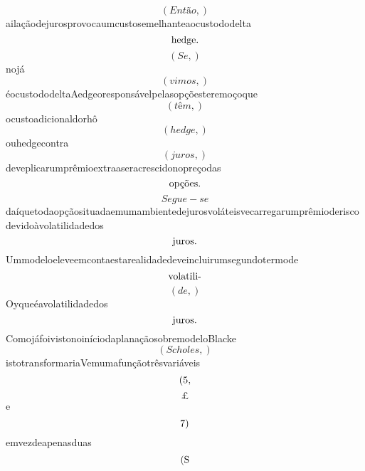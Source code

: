 \documentclass{article}
\begin{document}
\begin{equation}
\left( Então,\right)
\end{equation}ailaçãodejurosprovocaumcustosemelhanteaocustododelta\begin{equation}
$hedge.$
\end{equation}\begin{equation}
\left( Se,\right)
\end{equation}nojá\begin{equation}
\left( vimos,\right)
\end{equation}éocustododeltaAedgeoresponsávelpelasopçõesteremoçoque\begin{equation}
\left( têm,\right)
\end{equation}ocustoadicionaldorhô\begin{equation}
\left( hedge,\right)
\end{equation}ouhedgecontra\begin{equation}
\left( juros,\right)
\end{equation}deveplicarumprêmioextraaseracrescidonopreçodas\begin{equation}
$opções.$
\end{equation}\begin{equation}
Segue - se
\end{equation}daíquetodaopçãosituadaemumambientedejurosvoláteisvecarregarumprêmioderiscodevidoàvolatilidadedos\begin{equation}
$juros.$
\end{equation}Ummodeloeleveemcontaestarealidadedeveincluirumsegundotermode\begin{equation}
$volatili-$
\end{equation}\begin{equation}
\left( de,\right)
\end{equation}Oyqueéavolatilidadedos\begin{equation}
$juros.$
\end{equation}ComojáfoivistonoiníciodaplanaçãosobremodeloBlacke\begin{equation}
\left( Scholes,\right)
\end{equation}istotransformariaVemumafunçãotrêsvariáveis\begin{equation}
$(5,$
\end{equation}\begin{equation}
£
\end{equation}e\begin{equation}
$7)$
\end{equation}emvezdeapenasduas\begin{equation}
$(S$

\end{equation}
\end{document}
